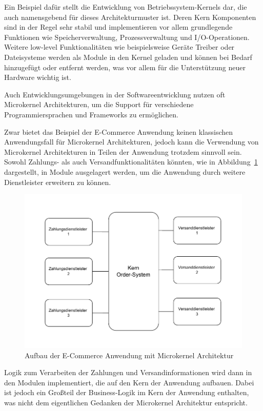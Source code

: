 \documentclass[acmtog]{acmart}
\begin{document}
Ein Beispiel dafür stellt die Entwicklung von Betriebssystem-Kernels dar, die auch namensgebend für dieses Architekturmuster ist.
Deren Kern Komponenten sind in der Regel sehr stabil und implementieren vor allem grundlegende Funktionen wie Speicherverwaltung, Prozessverwaltung und I/O-Operationen.
Weitere low-level Funktionalitäten wie beispielsweise Geräte Treiber oder Dateisysteme werden als Module in den Kernel geladen und können bei Bedarf hinzugefügt oder entfernt werden, was vor allem für die Unterstützung neuer Hardware wichtig ist.

Auch Entwicklungsumgebungen in der Softwareentwicklung nutzen oft Microkernel Architekturen, um die Support für verschiedene Programmiersprachen und Frameworks zu ermöglichen.

Zwar bietet das Beispiel der E-Commerce Anwendung keinen klassischen Anwendungsfall für Microkernel Architekturen, jedoch kann die Verwendung von Microkernel Architekturen in Teilen der Anwendung trotzdem sinnvoll sein.
Sowohl Zahlungs- als auch Versandfunktionalitäten könnten, wie in Abbildung~\ref{fig:ecommerce-microkernel} dargestellt, in Module ausgelagert werden, um die Anwendung durch weitere Dienstleister erweitern zu können.

\begin{figure}[!h]
  \centering
  \includegraphics[width=\linewidth]{images/microkernel/ecommerce-mikrokernel}
  \caption{Aufbau der E-Commerce Anwendung mit Microkernel Architektur}
  \label{fig:ecommerce-microkernel}
\end{figure}

Logik zum Verarbeiten der Zahlungen und Versandinformationen wird dann in den Modulen implementiert, die auf den Kern der Anwendung aufbauen.
Dabei ist jedoch ein Großteil der Business-Logik im Kern der Anwendung enthalten, was nicht dem eigentlichen Gedanken der Microkernel Architektur entspricht.
\end{document}
